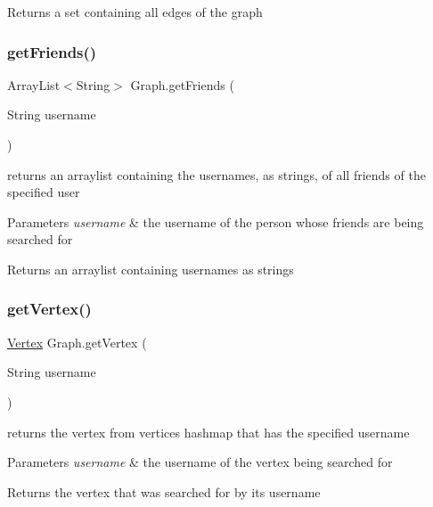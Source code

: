 \begin{DoxyReturn}{Returns}
a set containing all edges of the graph 
\end{DoxyReturn}
\mbox{\label{class_graph_a71fd5502d7ef1fb08f9ef49a3b507cb1}} 
\subsubsection{\texorpdfstring{get\+Friends()}{getFriends()}}
{\footnotesize\ttfamily Array\+List$<$String$>$ Graph.\+get\+Friends (\begin{DoxyParamCaption}\item[{String}]{username }\end{DoxyParamCaption})}



returns an arraylist containing the usernames, as strings, of all friends of the specified user 


\begin{DoxyParams}{Parameters}
{\em username} & the username of the person whose friends are being searched for \\
\hline
\end{DoxyParams}
\begin{DoxyReturn}{Returns}
an arraylist containing usernames as strings 
\end{DoxyReturn}
\mbox{\label{class_graph_a9ec421fd3402f637af8a9e99be3bb72c}} 
\subsubsection{\texorpdfstring{get\+Vertex()}{getVertex()}}
{\footnotesize\ttfamily \hyperlink{class_vertex}{Vertex} Graph.\+get\+Vertex (\begin{DoxyParamCaption}\item[{String}]{username }\end{DoxyParamCaption})}



returns the vertex from vertices hashmap that has the specified username 


\begin{DoxyParams}{Parameters}
{\em username} & the username of the vertex being searched for \\
\hline
\end{DoxyParams}
\begin{DoxyReturn}{Returns}
the vertex that was searched for by its username 
\end{DoxyReturn}
\mbox{\label{class_graph_a5dc8b9103d5d3fb7647b71df8fd35dbb}} 

